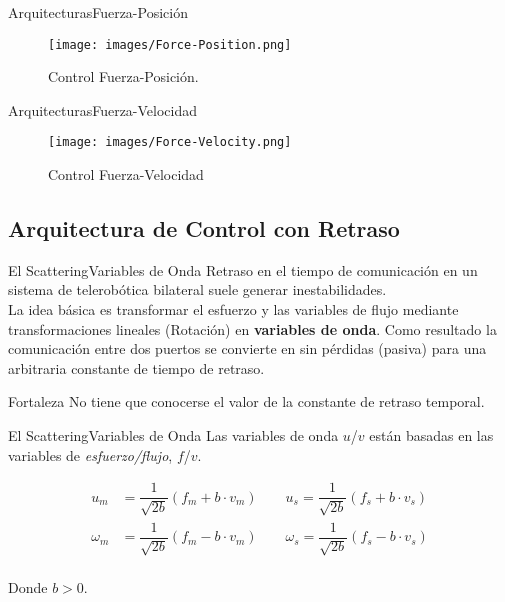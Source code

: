 \documentclass{beamer}
\begin{document}
\begin{frame}{Arquitecturas}{Fuerza-Posición}
	\begin{figure}[h!]
		\centering
		\texttt{[image: images/Force-Position.png]}
		\caption{Control Fuerza-Posición.}
		\label{FORPOS}
	\end{figure}
\end{frame}

\begin{frame}{Arquitecturas}{Fuerza-Velocidad}
	\begin{figure}[h!]
		\centering
		\texttt{[image: images/Force-Velocity.png]}
		\caption{Control Fuerza-Velocidad}
		\label{FORVEL}
	\end{figure}
\end{frame}

\subsection{Arquitectura de Control con Retraso}

\begin{frame}{El Scattering}{Variables de Onda}
	Retraso en el tiempo de comunicación en un sistema de telerobótica bilateral suele generar inestabilidades.\\
	\medskip
	La idea básica es transformar el esfuerzo y las variables de flujo mediante transformaciones lineales (Rotación) en \textbf{variables de onda}. Como resultado la comunicación entre dos puertos se convierte en sin pérdidas (pasiva) para una arbitraria constante de tiempo de retraso.\\
	\medskip
	\begin{block}{Fortaleza}
		No tiene que conocerse el valor de la constante de retraso temporal.
	\end{block}
\end{frame}

\begin{frame}{El Scattering}{Variables de Onda}
	Las variables de onda $u$/$v$ están basadas en las variables de \textit{esfuerzo/flujo}, $f$/$v$.
	
	\begin{equation}
		\begin{split}
			u_m&=\dfrac{1}{\sqrt{2b}}(f_m+b \cdot v_m) \qquad u_s=\dfrac{1}{\sqrt{2b}}(f_s+b \cdot v_s)\\
			\omega_m&=\dfrac{1}{\sqrt{2b}}(f_m-b \cdot v_m) \qquad \omega_s=\dfrac{1}{\sqrt{2b}}(f_s-b \cdot v_s)\\
		\end{split}
	\label{Scatter}
	\end{equation}
	
	Donde $b> 0$.
\end{frame}
\end{document}
